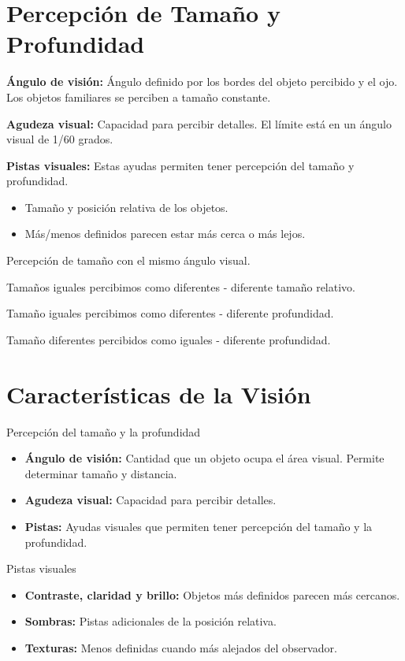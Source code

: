 \section{Percepción de Tamaño y Profundidad}
\textbf{Ángulo de visión:} Ángulo definido por los bordes del objeto percibido y el ojo. Los objetos familiares se perciben a tamaño constante.

\textbf{Agudeza visual:} Capacidad para percibir detalles. El límite está en un ángulo visual de 1/60 grados.

\textbf{Pistas visuales:} Estas ayudas permiten tener percepción del tamaño y profundidad.
\begin{itemize}
    \item Tamaño y posición relativa de los objetos.
    \item Más/menos definidos parecen estar más cerca o más lejos.
\end{itemize}

Percepción de tamaño con el mismo ángulo visual.

Tamaños iguales percibimos como diferentes - diferente tamaño relativo.

Tamaño iguales percibimos como diferentes - diferente profundidad.

Tamaño diferentes percibidos como iguales - diferente profundidad.

\section{Características de la Visión}
Percepción del tamaño y la profundidad
\begin{itemize}
    \item \textbf{Ángulo de visión:} Cantidad que un objeto ocupa el área visual. Permite determinar tamaño y distancia.
    \item \textbf{Agudeza visual:} Capacidad para percibir detalles.
    \item \textbf{Pistas:} Ayudas visuales que permiten tener percepción del tamaño y la profundidad.
\end{itemize}

Pistas visuales
\begin{itemize}
    \item \textbf{Contraste, claridad y brillo:} Objetos más definidos parecen más cercanos.
    \item \textbf{Sombras:} Pistas adicionales de la posición relativa.
    \item \textbf{Texturas:} Menos definidas cuando más alejados del observador.
\end{itemize}
